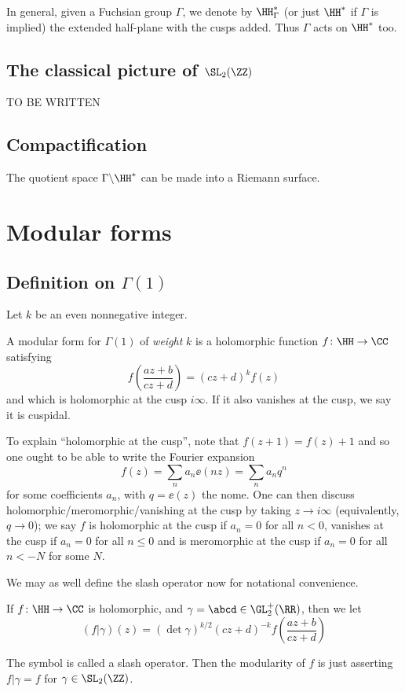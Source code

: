 In general, given a Fuchsian group $\Gamma$, we denote by $\HH^\ast_\Gamma$
(or just $\HH^\ast$ if $\Gamma$ is implied)
the extended half-plane with the cusps added.
Thus $\Gamma$ acts on $\HH^\ast$ too.

\subsection{The classical picture of $\SL_2(\ZZ)$}
TO BE WRITTEN

\subsection{Compactification}
The quotient space $\Gamma \backslash \HH^\ast$ can be made into a Riemann surface.


\section{Modular forms}
\subsection{Definition on $\Gamma(1)$}
Let $k$ be an even nonnegative integer.
\begin{definition}
  A \alert{modular form} for $\Gamma(1)$ of \emph{weight} $k$
  is a holomorphic function $f \colon \HH \to \CC$ satisfying
  \[ f \left( \frac{az+b}{cz+d} \right) = (cz+d)^k f(z) \]
  and which is holomorphic at the cusp $i\infty$.
  If it also vanishes at the cusp, we say it is \alert{cuspidal}.
\end{definition}
To explain ``holomorphic at the cusp'', note that $f(z+1) = f(z)+1$ and so one
ought to be able to write the Fourier expansion
\[ f(z) = \sum_{n} a_n \ee(nz) = \sum_n a_n q^n \]
for some coefficients $a_n$, with $q = \ee(z)$ the nome.
One can then discuss holomorphic/meromorphic/vanishing at the cusp
by taking $z \to i \infty$ (equivalently, $q \to 0$);
we say $f$ is holomorphic at the cusp if $a_n = 0$ for all $n < 0$,
vanishes at the cusp if $a_n = 0$ for all $n \le 0$
and is meromorphic at the cusp if $a_n = 0$ for all $n < -N$ for some $N$.

We may as well define the slash operator now for notational convenience.
\begin{definition}
  If $f \colon \HH \to \CC$ is holomorphic,
  and $\gamma = \abcd \in \GL_2^+(\RR)$, then we let
  \[ (f|\gamma)(z) = (\det \gamma)^{k/2} (cz+d)^{-k}
    f\left( \frac{az+b}{cz+d} \right) \]
\end{definition}
The symbol is called a \alert{slash operator}.
Then the modularity of $f$ is just asserting $f|\gamma = f$ for $\gamma \in \SL_2(\ZZ)$.

